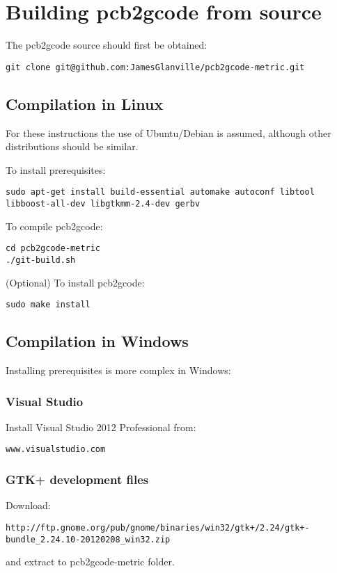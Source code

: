 \documentclass[a4paper,11pt]{article}  %
\begin{document}
\newpage
\section{Building pcb2gcode from source}

The pcb2gcode source should first be obtained:
\begin{lstlisting}[frame=single]
git clone git@github.com:JamesGlanville/pcb2gcode-metric.git
\end{lstlisting}

\subsection{Compilation in Linux}
For these instructions the use of Ubuntu/Debian is assumed, although other distributions should be similar.

To install prerequisites:
\begin{lstlisting}[frame=single,breaklines=true]
sudo apt-get install build-essential automake autoconf libtool libboost-all-dev libgtkmm-2.4-dev gerbv
\end{lstlisting}

To compile pcb2gcode:
\begin{lstlisting}[frame=single]
cd pcb2gcode-metric
./git-build.sh
\end{lstlisting}

(Optional) To install pcb2gcode:
\begin{lstlisting}[frame=single]
sudo make install
\end{lstlisting}

\subsection{Compilation in Windows}
Installing prerequisites is more complex in Windows:

\subsubsection{Visual Studio}
Install Visual Studio 2012 Professional from:
\begin{lstlisting}[frame=single]
www.visualstudio.com
\end{lstlisting}

\subsubsection{GTK+ development files}
Download:
\begin{lstlisting}[frame=single,breaklines=true]
http://ftp.gnome.org/pub/gnome/binaries/win32/gtk+/2.24/gtk+-bundle_2.24.10-20120208_win32.zip
\end{lstlisting}
and extract to pcb2gcode-metric folder.
\end{document}
